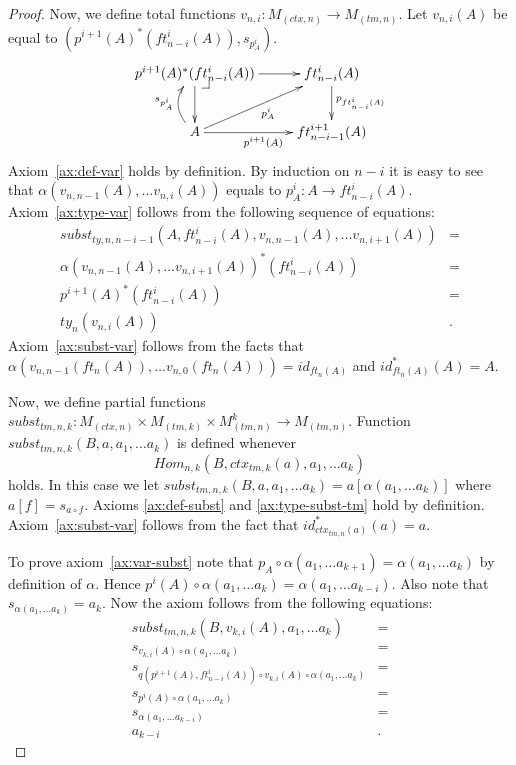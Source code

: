 \documentclass[reqno]{amsart}
\makeatletter
\theoremstyle{definition}
\theoremstyle{remark}
\numberwithin{figure}{section}
\newcommand{\pb}[1][dr]{\save*!/#1-1.2pc/#1:(-1,1)@^{|-}\restore}
\makeatother
\begin{document}
\begin{proof}
Now, we define total functions $v_{n,i} : M_{(ctx,n)} \to M_{(tm,n)}$.
Let $v_{n,i}(A)$ be equal to $(p^{i+1}(A)^*(ft^i_{n-i}(A)), s_{p^i_A})$.
\[ \xymatrix{ p^{i+1}(A)^*(ft^i_{n-i}(A)) \ar[r] \ar[d] \pb & ft^i_{n-i}(A) \ar[d]^{p_{ft^i_{n-i}(A)}} \\
              A \ar[r]_{p^{i+1}(A)} \ar@/^1pc/[u]^{s_{p^i_A}} \ar[ur]_{p^i_A} & ft^{i+1}_{n-i-1}(A)
            } \]
Axiom~\eqref{ax:def-var} holds by definition.
By induction on $n-i$ it is easy to see that $\alpha(v_{n,n-1}(A), \ldots v_{n,i}(A))$ equals to $p_A^i : A \to ft^i_{n-i}(A)$.
Axiom~\eqref{ax:type-var} follows from the following sequence of equations:
\begin{align*}
subst_{ty,n,n-i-1}(A, ft^i_{n-i}(A), v_{n,n-1}(A), \ldots v_{n,i+1}(A)) & = \\
\alpha(v_{n,n-1}(A), \ldots v_{n,i+1}(A))^*(ft^i_{n-i}(A)) & = \\
p^{i+1}(A)^*(ft^i_{n-i}(A)) & = \\
ty_n(v_{n,i}(A)) & .
\end{align*}
Axiom~\eqref{ax:subst-var} follows from the facts that $\alpha(v_{n,n-1}(ft_n(A)), \ldots v_{n,0}(ft_n(A))) = id_{ft_n(A)}$ and $id_{ft_n(A)}^*(A) = A$.

Now, we define partial functions $subst_{tm,n,k} : M_{(ctx,n)} \times M_{(tm,k)} \times M_{(tm,n)}^k \to M_{(tm,n)}$.
Function $subst_{tm,n,k}(B, a, a_1, \ldots a_k)$ is defined whenever \[ Hom_{n,k}(B, ctx_{tm,k}(a), a_1, \ldots a_k) \] holds.
In this case we let $subst_{tm,n,k}(B, a, a_1, \ldots a_k) = a[\alpha(a_1, \ldots a_k)]$ where $a[f] = s_{a \circ f}$.
Axioms \eqref{ax:def-subst} and \eqref{ax:type-subst-tm} hold by definition.
Axiom~\eqref{ax:subst-var} follows from the fact that $id_{ctx_{tm,n}(a)}^*(a) = a$.

To prove axiom~\eqref{ax:var-subst} note that $p_A \circ \alpha(a_1, \ldots a_{k+1}) = \alpha(a_1, \ldots a_k)$ by definition of $\alpha$.
Hence $p^i(A) \circ \alpha(a_1, \ldots a_k) = \alpha(a_1, \ldots a_{k-i})$.
Also note that $s_{\alpha(a_1, \ldots a_k)} = a_k$.
Now the axiom follows from the following equations:
\begin{align*}
subst_{tm,n,k}(B, v_{k,i}(A), a_1, \ldots a_k) & = \\
s_{v_{k,i}(A) \circ \alpha(a_1, \ldots a_k)} & = \\
s_{q(p^{i+1}(A), ft^i_{n-i}(A)) \circ v_{k,i}(A) \circ \alpha(a_1, \ldots a_k)} & = \\
s_{p^i(A) \circ \alpha(a_1, \ldots a_k)} & = \\
s_{\alpha(a_1, \ldots a_{k-i})} & = \\
a_{k-i} & .
\end{align*}


\end{proof}
\end{document}
